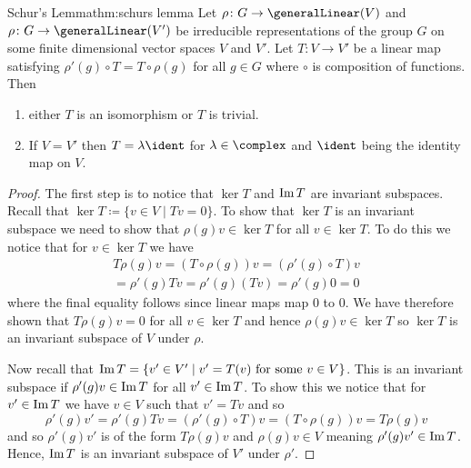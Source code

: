 \begin{thm}{Schur's Lemma}{thm:schurs lemma}
    Let \(\rho\colon G \to \generalLinear(V)\) and \(\rho\colon G \to
    \generalLinear(V')\) be irreducible representations of the group \(G\) on some
    finite dimensional vector spaces \(V\) and \(V'\).
    Let \(T \colon V \to V'\) be a linear map satisfying \(\rho'(g) \circ T
    = T \circ \rho(g)\) for all \(g \in G\) where \(\circ\) is composition of
    functions.
    Then
    \begin{enumerate}
        \item either \(T\) is an isomorphism or \(T\) is trivial.
        \item If \(V = V'\) then \(T = \lambda\ident\) for \(\lambda \in
        \complex\) and \(\ident\) being the identity map on \(V\).
    \end{enumerate}
    \begin{proof}
        The first step is to notice that \(\ker T\) and \(\operatorname{Im} T\) are
        invariant subspaces.
        Recall that \(\ker T \coloneqq \{v \in V \mid Tv = 0\}\).
        To show that \(\ker T\) is an invariant subspace we need to show
        that \(\rho(g)v \in \ker T\) for all \(v \in \ker T\).
        To do this we notice that for \(v\in\ker T\) we have
        \begin{multline}
            T\rho(g)v = (T \circ \rho(g))v = (\rho'(g) \circ T)v\\
            = \rho'(g)Tv = \rho'(g)(Tv) = \rho'(g)0 = 0
        \end{multline}
        where the final equality follows since linear maps map 0 to 0.
        We have therefore shown that \(T\rho(g)v = 0\) for all \(v \in \ker
        T\) and hence \(\rho(g)v \in \ker T\) so \(\ker T\) is an invariant subspace of
        \(V\) under \(\rho\).
        
        Now recall that \(\operatorname{Im} T = \{v' \in V' \mid v' = T(v) \text{ for
            some } v \in V\}\).
        This is an invariant subspace if \(\rho'(g)v \in \operatorname{Im} T\) for all
        \(v' \in \operatorname{Im} T\).
        To show this we notice that for \(v' \in \operatorname{Im} T\) we have \(v\in
        V\) such that \(v' = Tv\) and so
        \begin{equation}
            \rho'(g)v' = \rho'(g)Tv = (\rho'(g) \circ T)v = (T\circ
            \rho(g))v = T\rho(g)v
        \end{equation}
        and so \(\rho'(g)v'\) is of the form \(T\rho(g)v\) and \(\rho(g)v
        \in V\) meaning \(\rho'(g) v' \in \operatorname{Im} T\).
        Hence, \(\operatorname{Im} T\) is an invariant subspace of \(V'\) under
        \(\rho'\).
        

\end{proof}
\end{thm}
